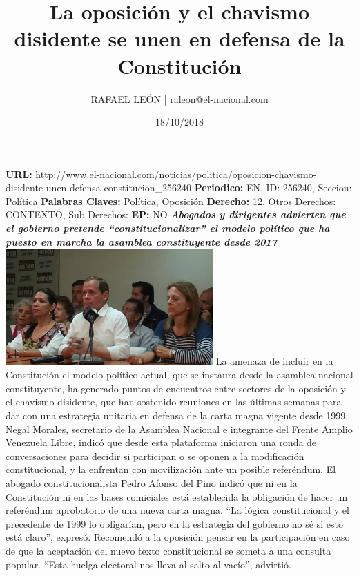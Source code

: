 \documentclass{article}%
\title{\textbf{La oposición y el chavismo disidente se unen en defensa de la Constitución}}%
\author{RAFAEL LEÓN | raleon@el{-}nacional.com}%
\date{18/10/2018}%
\begin{document}
%
\normalsize%
\maketitle%
\textbf{URL: }%
http://www.el{-}nacional.com/noticias/politica/oposicion{-}chavismo{-}disidente{-}unen{-}defensa{-}constitucion\_256240\newline%
%
\textbf{Periodico: }%
EN, %
ID: %
256240, %
Seccion: %
Política\newline%
%
\textbf{Palabras Claves: }%
Política, Oposición\newline%
%
\textbf{Derecho: }%
12, %
Otros Derechos: %
CONTEXTO, %
Sub Derechos: %
\newline%
%
\textbf{EP: }%
NO\newline%
\newline%
%
\textbf{\textit{Abogados y dirigentes advierten que el gobierno pretende “constitucionalizar” el modelo político que ha puesto en marcha la asamblea constituyente desde 2017}}%
\newline%
\newline%
%
\includegraphics[width=300px]{98.jpg}%
\newline%
%
La amenaza de incluir en la Constitución el modelo político actual, que se instaura desde la asamblea nacional constituyente, ha generado puntos de encuentros entre sectores de la oposición y el chavismo disidente, que han sostenido reuniones en las últimas semanas para dar con una estrategia unitaria en defensa de la carta magna vigente desde 1999.%
\newline%
%
Negal Morales, secretario de la Asamblea Nacional e integrante del Frente Amplio Venezuela Libre, indicó que desde esta plataforma iniciaron una ronda de conversaciones para decidir si participan o se oponen a la modificación constitucional, y la enfrentan con movilización ante un posible referéndum.%
\newline%
%
El abogado constitucionalista Pedro Afonso del Pino indicó que ni en la Constitución ni en las bases comiciales está establecida la obligación de hacer un referéndum aprobatorio de una nueva carta magna. “La lógica constitucional y el precedente de 1999 lo obligarían, pero en la estrategia del gobierno no sé si esto está claro”, expresó. Recomendó a la oposición pensar en la participación en caso de que la aceptación del nuevo texto constitucional se someta a una consulta popular. “Esta huelga electoral nos lleva al salto al vacío”, advirtió.%
\end{document}
